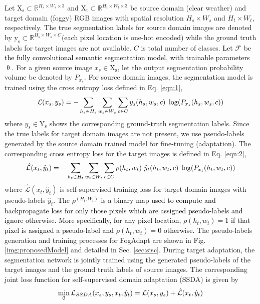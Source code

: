 \documentclass[final,5p,times,twocolumn]{elsarticle}
\begin{document}
Let $\mathrm{X_s}  \subset \mathbb{R} ^{H_s\times W_s\times 3}$ and $\mathrm{X_t} \subset \mathbb{R} ^{H_t\times W_t\times 3}$ be source domain (clear weather) and target domain (foggy) RGB images with spatial resolution $H_s\times W_s$ and $H_t\times W_t$, respectively. The true segmentation labels for source domain images are denoted by $\mathrm{y_s} \subset \mathbb{R} ^{H_s\times W_s\times C}$(each pixel location is one-hot encoded) while the ground truth labels for target images are not available. 
$C$ is total number of classes. 
\textcolor{black}{Let $\mathcal{F}$ be the fully convolutional semantic segmentation model, with trainable parameters $\uptheta$.
}
For a given source image $x_s \in \mathrm{X_s}$, let the output segmentation probability volume be denoted by $P_{x_s}$. 
For source domain images, the segmentation model is trained using the cross entropy loss defined in Eq. \ref{eqn:1},
\begin{equation}
\small
     \mathcal{L} (x_s, y_s) = -\sum_{h_s \in H_s} \sum_{w_s \in W_s}\sum_{c\in C} y_s(h_s, w_s, c) ~\log(P_{x_s}(h_s, w_s, c))
\label{eqn:1}
\end{equation}
where $y_s \in \mathrm{Y_s}$ shows the corresponding ground-truth segmentation labels.
Since the true labels for target domain images are not present, we use pseudo-labels generated by the source domain trained model for fine-tuning (adaptation).
The corresponding cross entropy loss for the target images is defined in Eq. \ref{eqn:2},
\begin{equation}
\small
     \mathcal{\hat{L}} (x_t, \hat{y}_t) = -\sum_{h_t \in H_t} \sum_{w_t \in W_t}\sum_{c \in C} \rho(h_t,w_t) ~\hat{y}_t(h_t, w_t, c) ~\log(P_{x_t}(h_t, w_t, c))
\label{eqn:2}
\end{equation}
where $\mathcal{\hat{L}} (x_t, \hat{y}_t)$  is self-supervised training loss for target domain images with pseudo-labels $\hat{y}_t$. 
\textcolor{black}{The $\rho^{(H_t,W_t)}$ is a binary map used to compute and backpropagate loss for only those pixels which are assigned pseudo-labels and ignore otherwise. More specifically, for any pixel location, $\rho(h_t,w_t)=1$ if that pixel is assigned a pseudo-label and $\rho(h_t,w_t)=0$ otherwise. }
The pseudo-labels generation and training processes for FogAdapt are shown in Fig. \ref{img:proposedModel} and detailed in Sec. \ref{sec:sisc}. 
During target adaptation, the segmentation network is jointly trained using the generated pseudo-labels of the target images and the ground truth labels of source images. 
The corresponding joint loss function for self-supervised domain adaptation (SSDA) is given by \begin{equation}
\small
\min_{\uptheta} \mathcal{L}_{SSDA} ( x_s, y_s, x_t, \hat{y}_t) = \mathcal{L} (x_s, y_s) + \mathcal{\hat{L}} (x_t, \hat{y}_t)
\label{eqn:3}
\end{equation}
\end{document}

